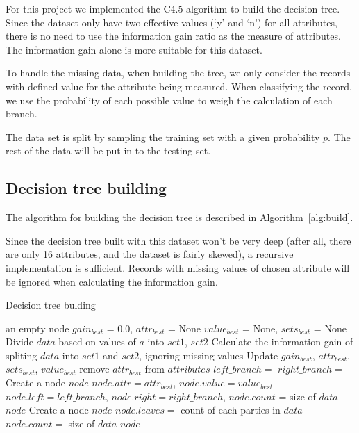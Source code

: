\documentclass{article}
\begin{document}
For this project we implemented the C4.5 algorithm to build the decision tree. Since the dataset only have two effective values (`y' and `n') for all attributes, there is no need to use the information gain ratio as the measure of attributes. The information gain alone is more suitable for this dataset.

To handle the missing data, when building the tree, we only consider the records with defined value for the attribute being measured. When classifying the record, we use the probability of each possible value to weigh the calculation of each branch.

The data set is split by sampling the training set with a given probability $p$. The rest of the data will be put in to the testing set.

\subsection{Decision tree building}

The algorithm for building the decision tree is described in Algorithm~\ref{alg:build}.

Since the decision tree built with this dataset won't be very deep (after all, there are only 16 attributes, and the dataset is fairly skewed), a recursive implementation is sufficient. Records with missing values of chosen attribute will be ignored when calculating the information gain.

\begin{algorithm}[H]
\centering
\caption{Decision tree bulding}
\label{alg:build}
  \begin{algorithmic}[1]
        	\State \Return an empty node
        \EndIf
        \State $gain_{best}$ = 0.0, $attr_{best}$ = None
        \State $value_{best}$ = None, $sets_{best}$ = None
    		\State Divide $data$ based on values of $a$ into $set1$, $set2$
    		\State Calculate the information gain of spliting $data$ into $set1$ and $set2$, ignoring missing values
    			\State Update $gain_{best}$, $attr_{best}$, $sets_{best}$, $value_{best}$
    		\EndIf
	    \EndFor
	    	\State remove $attr_{best}$ from $attributes$
	    	\State $left\_branch =$ 
	    	\State $right\_branch =$ 
	    	\State Create a node $node$
	    	\State $node.attr = attr_{best}$, $node.value = value_{best}$
	    	\State $node.left = left\_branch$, $node.right = right\_branch$, $node.count$ = size of $data$
	    	\State \Return $node$
      	\Else
      		\State Create a node $node$
      		\State $node.leaves = $ count of each parties in $data$
      		\State $node.count = $ size of $data$
      		\State \Return $node$
      	\EndIf
    \EndFunction
  \end{algorithmic}
\end{algorithm}
\end{document}
